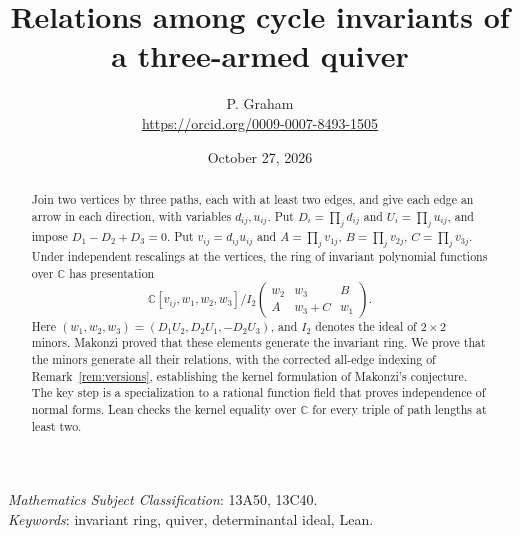 \documentclass[11pt]{article}
\title{Relations among cycle invariants of a three-armed quiver}
\author{P. Graham\\ \small\url{https://orcid.org/0009-0007-8493-1505}}
\date{October 27, 2026}
\theoremstyle{remark}
\newcommand{\CC}{\mathbb C}
\begin{document}
\maketitle
\begin{abstract}
Join two vertices by three paths, each with at least two edges, and give
each edge an arrow in each direction, with variables $d_{ij},u_{ij}$.
Put $D_i=\prod_jd_{ij}$ and $U_i=\prod_ju_{ij}$, and impose
$D_1-D_2+D_3=0$. Put $v_{ij}=d_{ij}u_{ij}$ and
$A=\prod_jv_{1j}$, $B=\prod_jv_{2j}$, $C=\prod_jv_{3j}$.
Under independent rescalings at the vertices, the ring of invariant
polynomial functions over $\CC$ has presentation
\[
 \CC[v_{ij},w_1,w_2,w_3]\big/I_2\!\begin{pmatrix}
 w_2&w_3&B\\ A&w_3+C&w_1
 \end{pmatrix}.
\]
Here $(w_1,w_2,w_3)=(D_1U_2,D_2U_1,-D_2U_3)$, and $I_2$ denotes the ideal
of $2\times2$ minors. Makonzi proved that these elements generate the
invariant ring. We prove that the minors generate all their relations,
with the corrected all-edge indexing of Remark~\ref{rem:versions},
establishing the kernel formulation of Makonzi's conjecture.
The key step is a specialization to
a rational function field that proves independence of normal forms.
Lean checks the kernel equality over $\CC$ for every triple of path
lengths at least two.
\end{abstract}

 \emph{Mathematics Subject Classification}: 13A50, 13C40.\\
\emph{Keywords}: invariant ring, quiver, determinantal ideal, Lean.
\end{document}
